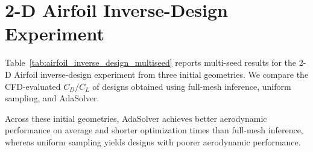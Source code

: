 \section{2-D Airfoil Inverse-Design Experiment}
\label{app:airfoil_inverse_design_multiseed}

Table~\ref{tab:airfoil_inverse_design_multiseed} reports multi-seed results
for the 2-D Airfoil inverse-design experiment from three initial geometries.
We compare the CFD-evaluated $C_D/C_L$ of designs obtained using full-mesh
inference, uniform sampling, and AdaSolver.


\FloatBarrier

Across these initial geometries, AdaSolver achieves better aerodynamic
performance on average and shorter optimization times than full-mesh
inference, whereas uniform sampling yields designs with poorer aerodynamic
performance.
